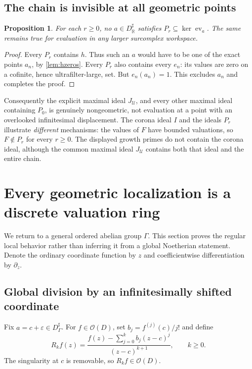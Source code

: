 \documentclass[11pt,letterpaper]{article}
\numberwithin{equation}{section}
\newtheorem{proposition}[theorem]{Proposition}
\theoremstyle{definition}
\theoremstyle{remark}
\newcommand{\R}{\mathbb R}
\newcommand{\OO}{\mathcal O}
\newcommand{\UU}{\mathcal U}
\newcommand{\ev}{\operatorname{ev}}
\begin{document}
\subsection{The chain is invisible at all geometric points}
\begin{proposition}\label{prop:invisible}
For each $r\ge0$, no $a\in D^\sharp_\R$ satisfies
$P_r\subseteq\ker\ev_a$. The same remains true for evaluation in any
larger surcomplex workspace.
\end{proposition}
\begin{proof}
Every $P_r$ contains $h$. Thus such an $a$ would have to be one of the
exact points $a_n$, by \cref{lem:hzeros}. Every $P_r$ also contains every
$e_n$: its values are zero on a cofinite, hence ultrafilter-large, set.
But $e_n(a_n)=1$. This excludes $a_n$ and completes the proof.
\end{proof}

Consequently the explicit maximal ideal $J_\UU$, and every other maximal
ideal containing $P_0$, is genuinely nongeometric, not evaluation at a
point with an overlooked infinitesimal displacement. The corona ideal $I$ and the ideals $P_r$ illustrate
\emph{different} mechanisms: the values of $F$ have bounded valuations,
so $F\notin P_r$ for every $r\ge0$. The displayed growth primes do not contain the corona ideal, although
the common maximal ideal $J_\UU$ contains both that ideal and the
entire chain.

\section{Every geometric localization is a discrete valuation ring}
\label{sec:dvr}
We return to a general ordered abelian group $\Gamma$. This section
proves the regular local behavior rather than inferring it from a global
Noetherian statement. Denote the ordinary coordinate function by $z$ and
coefficientwise differentiation by $\partial_z$.

\subsection{Global division by an infinitesimally shifted coordinate}
Fix $a=c+\varepsilon\in D^\sharp_\Gamma$. For $f\in\OO(D)$, set
$b_j=f^{(j)}(c)/j!$ and define
\begin{equation}\label{eq:remainders}
 R_kf(z)=\frac{f(z)-\sum_{j=0}^k b_j(z-c)^j}{(z-c)^{k+1}},
 \qquad k\ge0.
\end{equation}
The singularity at $c$ is removable, so $R_kf\in\OO(D)$.
\end{document}
